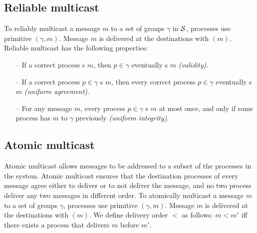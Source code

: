\subsection{Reliable multicast}
\label{sec:rmcast}
To reliably multicast a message $m$ to a set of groups $\gamma$ in $\mathcal{S}$, processes use
primitive \rmcast$(\gamma, m)$.  Message $m$ is delivered at the destinations
with \rmdel$(m)$.  Reliable multicast has the following properties:

\begin{itemize}

    \item[--] If a correct process \rmcast{}s $m$, then  $p \in \gamma$ eventually \rmdel{}s $m$ \emph{(validity)}.

    \item[--] If a correct process $p \in \gamma$ \rmdel{}s $m$, then every correct
      process $p \in \gamma$ eventually \rmdel{}s $m$ \emph{(uniform agreement)}.

    \item[--] For any message $m$, every process $p \in \gamma$ \rmdel{}s $m$
      at most once, and only if some process has \rmcast{} $m$ to $\gamma$
      previously \emph{(uniform integrity)}.

\end{itemize}

\subsection{Atomic multicast}
\label{sec:amcast}
Atomic multicast allows messages to be addressed to a subset of the processes in
the system. Atomic multicast ensures that the destination processes of every
message agree either to deliver or to not deliver the message, and no two
process deliver any two messages in different order. To atomically multicast a
message $m$ to a set of groups $\gamma$, processes use primitive
\amcast$(\gamma, m)$.  Message $m$ is delivered at the destinations with
\amdel$(m)$.  We define delivery order $<$ as follows: $m < m'$ iff there exists
a process that delivers $m$ before $m'$.

